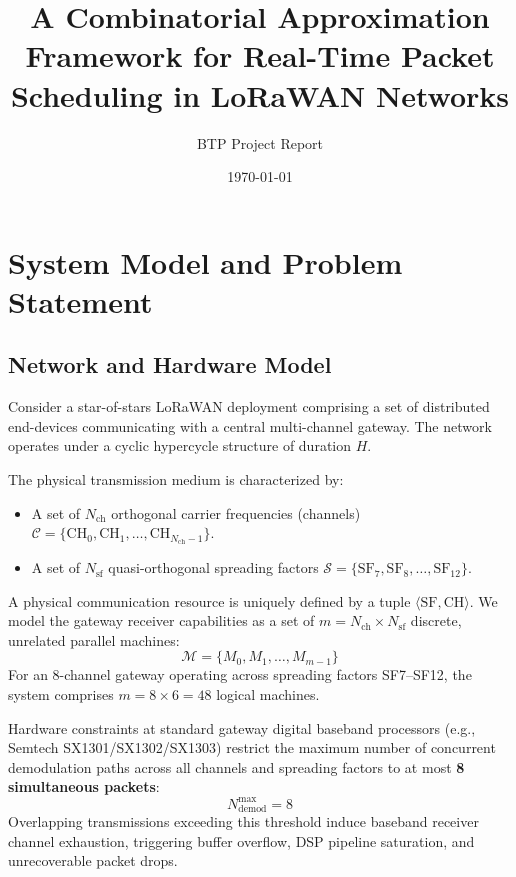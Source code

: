 \documentclass{article}
\title{\textbf{A Combinatorial Approximation Framework for Real-Time Packet Scheduling in LoRaWAN Networks}}
\author{BTP Project Report}
\date{\today}
\begin{document}
\maketitle

\section{System Model and Problem Statement}
\label{sec:model}

\subsection{Network and Hardware Model}
Consider a star-of-stars LoRaWAN deployment comprising a set of distributed end-devices communicating with a central multi-channel gateway. The network operates under a cyclic hypercycle structure of duration $H$. 

The physical transmission medium is characterized by:
\begin{itemize}
    \item A set of $N_{\text{ch}}$ orthogonal carrier frequencies (channels) $\mathcal{C} = \{\text{CH}_0, \text{CH}_1, \dots, \text{CH}_{N_{\text{ch}}-1}\}$.
    \item A set of $N_{\text{sf}}$ quasi-orthogonal spreading factors $\mathcal{S} = \{\text{SF}_7, \text{SF}_8, \dots, \text{SF}_{12}\}$.
\end{itemize}

A physical communication resource is uniquely defined by a tuple $\langle \text{SF}, \text{CH} \rangle$. We model the gateway receiver capabilities as a set of $m = N_{\text{ch}} \times N_{\text{sf}}$ discrete, unrelated parallel machines:
\begin{equation}
\mathcal{M} = \{M_0, M_1, \dots, M_{m-1}\}
\end{equation}
For an 8-channel gateway operating across spreading factors SF7--SF12, the system comprises $m = 8 \times 6 = 48$ logical machines.

Hardware constraints at standard gateway digital baseband processors (e.g., Semtech SX1301/SX1302/SX1303) restrict the maximum number of concurrent demodulation paths across all channels and spreading factors to at most \textbf{8 simultaneous packets}:
\begin{equation}
N_{\text{demod}}^{\max} = 8
\end{equation}
Overlapping transmissions exceeding this threshold induce baseband receiver channel exhaustion, triggering buffer overflow, DSP pipeline saturation, and unrecoverable packet drops.
\end{document}
